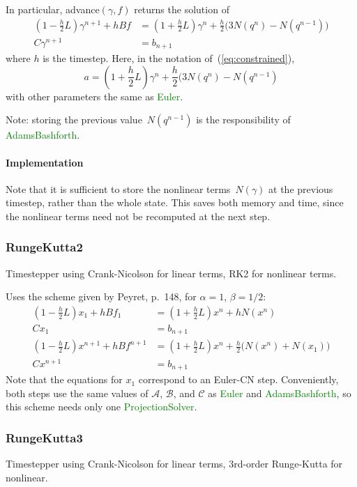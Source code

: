 \documentclass[11pt]{article}
\def\class#1{\textcolor{green}{\ttfamily\small #1}} %
\def\fn#1{{\ttfamily\small #1}} %
\begin{document}
In particular, \fn{advance}$(\gamma,f)$ returns the solution of
	\begin{align}
		(1-\frac{h}{2}L)\gamma^{n+1} + hBf &= (1 + \frac{h}{2}L)\gamma^n + \frac{h}{2} \big(3N(q^n) - N(q^{n-1})\big)\\
		C\gamma^{n+1} &= b_{n+1}
	\end{align}
where $h$ is the timestep.  Here, in the notation of~(\ref{eq:constrained}),
\begin{equation}
	a = (1+\frac{h}{2}L)\gamma^n + \frac{h}{2}(3N(q^n) - N(q^{n-1})
\end{equation}
with other parameters the same as \class{Euler}.

Note: storing the previous value~$N(q^{n-1})$ is the responsibility of \class{AdamsBashforth}.

\paragraph{Implementation}
Note that it is sufficient to store the nonlinear terms~$N(\gamma)$ at the previous timestep, rather than the whole state. This saves both memory and time, since the nonlinear terms need not be recomputed at the next step.

\subsubsection{RungeKutta2}
Timestepper using Crank-Nicolson for linear terms, RK2 for nonlinear terms.

Uses the scheme given by Peyret, p.~148\cite{Peyret:2002}, for $\alpha=1$, $\beta=1/2$:
\begin{align}
	(1 - \frac{h}{2}L)x_1 + hBf_1 &= (1+\frac{h}{2}L)x^n + hN(x^n)\\
	Cx_1 &= b_{n+1}\\
	(1-\frac{h}{2}L)x^{n+1} + hBf^{n+1} &= (1 + \frac{h}{2}L)x^n + \frac{h}{2}\big(N(x^n) + N(x_1)\big)\\
	Cx^{n+1} &= b_{n+1}
\end{align}
Note that the equations for $x_1$ correspond to an Euler-CN step.  Conveniently, both steps use the same values of $\mathcal{A}$, $\mathcal{B}$, and $\mathcal{C}$ as \class{Euler} and \class{AdamsBashforth}, so this scheme needs only one \class{ProjectionSolver}.

\subsubsection{RungeKutta3}
Timestepper using Crank-Nicolson for linear terms, 3rd-order Runge-Kutta for nonlinear.
\end{document}
